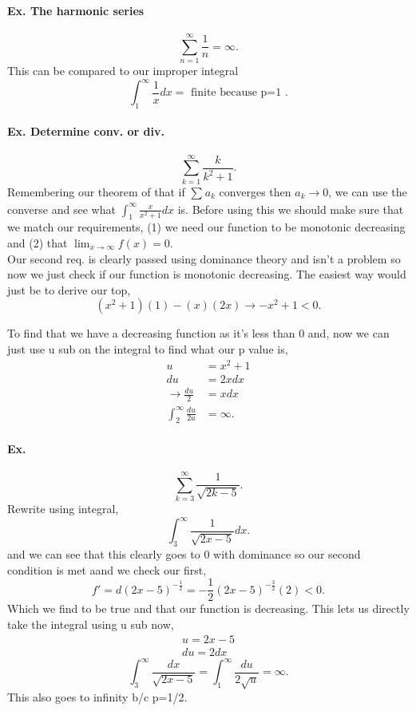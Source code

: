 \paragraph{Ex. The harmonic series}
\[
\sum_{ n=1 } ^{ \infty } \frac{ 1 }{ n } =\infty
.\] 
This can be compared to our improper integral
\[
\int_{ 1 }^{ \infty } \frac{ 1 }{ x } dx= \text{ finite because p=1 }
.\] 

\paragraph{Ex. Determine conv. or div.}
\[
\sum_{ k=1 } ^{ \infty } \frac{ k }{ k^2+1 } 
.\] 
Remembering our theorem of that if $ \sum_{  } ^{  } a_k $ converges then $ a_k\to 0 $, we can use the converse and see what $ \int_{ 1 }^{ \infty } \frac{ x }{ x^2+1 } dx $ is. Before using this we should make sure that we match our requirements, (1) we need our function to be monotonic decreasing and (2) that $ \lim_{ x \to \infty} f\left( x \right) =0 $. \\

Our second req. is clearly passed using dominance theory and isn't a problem so now we just check if our function is monotonic decreasing. The easiest way would just be to derive our top,
\[
\left( x^2+1 \right) \left( 1 \right) -\left( x \right) \left( 2x \right) \to -x^2+1<0
.\] 

To find that we have a decreasing function as it's less than 0 and, now we can just use u sub on the integral to find what our p value is,
\begin{align*}
u&= x^2+1 \\
du&= 2xdx \\
\to \frac{ du }{ 2 } &= xdx \\
\int_{ 2 }^{ \infty } \frac{ du }{ 2u } &= \infty
.\end{align*}

\paragraph{Ex.}
\[
\sum_{ k=3 } ^{ \infty } \frac{ 1 }{ \sqrt{ 2k-5} } 
.\] 
Rewrite using integral,
\[
\int_{ 3 }^{ \infty } \frac{ 1 }{ \sqrt{ 2x-5} } dx
.\] 
and we can see that this clearly goes to 0 with dominance so our second condition is met aand we check our first,
\[
f'=d\left( 2x-5 \right) ^{ -\frac{ 1 }{ 2 }  }=-\frac{ 1 }{ 2 } \left( 2x-5 \right) ^{ -\frac{ 3 }{ 2 }  }\left( 2 \right) <0
.\] 
Which we find to be true and that our function is decreasing. This lets us directly take the integral using u sub now,
\begin{gather*}
u=2x-5 \\
du = 2dx
\end{gather*}
\[
\int_{ 3 }^{ \infty } \frac{ dx }{ \sqrt{ 2x-5} }=\int_{ 1 }^{ \infty } \frac{ du }{ 2\sqrt{ u} } =\infty
.\] 
This also goes to infinity b/c p=1/2.

